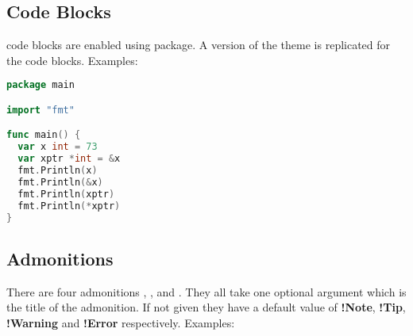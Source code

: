 \documentclass[12pt,a4paper]{report}
\begin{document}
\subsection{Code Blocks}
code blocks are enabled using  package. A version of the  theme is replicated for the code blocks. Examples:

\noindent
\begin{lstlisting}[language=go]
package main

import "fmt"

func main() {
  var x int = 73
  var xptr *int = &x
  fmt.Println(x)
  fmt.Println(&x)
  fmt.Println(xptr)
  fmt.Println(*xptr)
}
\end{lstlisting}

\subsection{Admonitions}
There are four admonitions , ,  and . They all take one optional argument which is the title of the admonition. If not given they have a default value of \textbf{!Note}, \textbf{!Tip}, \textbf{!Warning} and \textbf{!Error} respectively. Examples:\\
\end{document}
